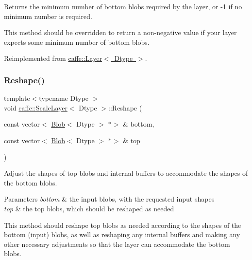 Returns the minimum number of bottom blobs required by the layer, or -\/1 if no minimum number is required. 

This method should be overridden to return a non-\/negative value if your layer expects some minimum number of bottom blobs. 

Reimplemented from \mbox{\hyperlink{classcaffe_1_1_layer_aca3cb2bafaefda5d4760aaebd0b72def}{caffe\+::\+Layer$<$ Dtype $>$}}.

\mbox{\label{classcaffe_1_1_scale_layer_aeafe805a68903bae9a7f2b98bf453e22}} 
\subsubsection{\texorpdfstring{Reshape()}{Reshape()}\hspace{0.1cm}{\footnotesize\ttfamily [1/2]}}
{\footnotesize\ttfamily template$<$typename Dtype $>$ \\
void \mbox{\hyperlink{classcaffe_1_1_scale_layer}{caffe\+::\+Scale\+Layer}}$<$ Dtype $>$\+::Reshape (\begin{DoxyParamCaption}\item[{const vector$<$ \mbox{\hyperlink{classcaffe_1_1_blob}{Blob}}$<$ Dtype $>$ $\ast$$>$ \&}]{bottom,  }\item[{const vector$<$ \mbox{\hyperlink{classcaffe_1_1_blob}{Blob}}$<$ Dtype $>$ $\ast$$>$ \&}]{top }\end{DoxyParamCaption})\hspace{0.3cm}{\ttfamily [virtual]}}



Adjust the shapes of top blobs and internal buffers to accommodate the shapes of the bottom blobs. 


\begin{DoxyParams}{Parameters}
{\em bottom} & the input blobs, with the requested input shapes \\
\hline
{\em top} & the top blobs, which should be reshaped as needed\\
\hline
\end{DoxyParams}
This method should reshape top blobs as needed according to the shapes of the bottom (input) blobs, as well as reshaping any internal buffers and making any other necessary adjustments so that the layer can accommodate the bottom blobs. 

